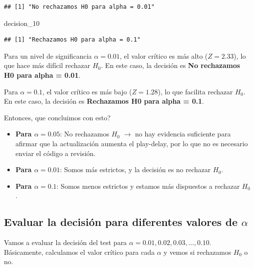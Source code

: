 \documentclass[
]{article}
\newenvironment{Shaded}{\begin{snugshade}}{\end{snugshade}}
\newcommand{\NormalTok}[1]{#1}
\providecommand{\tightlist}{%
  \setlength{\itemsep}{0pt}\setlength{\parskip}{0pt}}
\begin{document}
\begin{verbatim}
## [1] "No rechazamos H0 para alpha = 0.01"
\end{verbatim}

\begin{Shaded}
\begin{Highlighting}[]
\NormalTok{decision\_10}
\end{Highlighting}
\end{Shaded}

\begin{verbatim}
## [1] "Rechazamos H0 para alpha = 0.1"
\end{verbatim}

Para un nivel de significancia \(\alpha = 0.01\), el valor crítico es
más alto (\(Z = 2.33\)), lo que hace más difícil rechazar \(H_0\). En
este caso, la decisión es \textbf{No rechazamos H0 para alpha = 0.01}.

Para \(\alpha = 0.1\), el valor crítico es más bajo (\(Z = 1.28\)), lo
que facilita rechazar \(H_0\). En este caso, la decisión es
\textbf{Rechazamos H0 para alpha = 0.1}.

Entonces, que concluimos con esto?

\begin{itemize}
\tightlist
\item
  \textbf{Para \(\alpha = 0.05\)}: No rechazamos \(H_0\) \(\rightarrow\)
  no hay evidencia suficiente para afirmar que la actualización aumenta
  el play-delay, por lo que no es necesario enviar el código a revisión.
\item
  \textbf{Para \(\alpha = 0.01\)}: Somos más estrictos, y la decisión es
  no rechazar \(H_0\).
\item
  \textbf{Para \(\alpha = 0.1\)}: Somos menos estrictos y estamos más
  dispuestos a rechazar \(H_0\).
\end{itemize}

\subsection{\texorpdfstring{Evaluar la decisión para diferentes valores
de
\(\alpha\)}{Evaluar la decisión para diferentes valores de \textbackslash alpha}}\label{evaluar-la-decisiuxf3n-para-diferentes-valores-de-alpha}

Vamos a evaluar la decisión del test para
\(\alpha = 0.01, 0.02, 0.03, \ldots, 0.10\). Básicamente, calculamos el
valor crítico para cada \(\alpha\) y vemos si rechazamos \(H_0\) o no.
\end{document}
